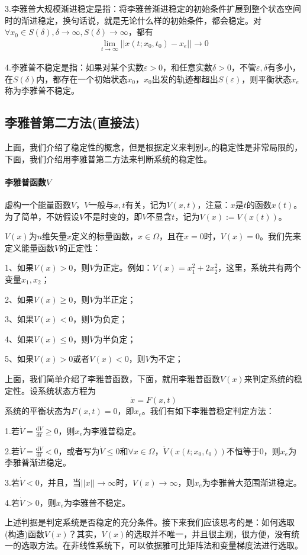         \par
        3.李雅普大规模渐进稳定是指：将李雅普渐进稳定的初始条件扩展到整个状态空间时的渐进稳定，换句话说，就是无论什么样的初始条件，都会稳定。对$\forall x_0\in S(\delta),\delta\rightarrow\infty ,S(\delta)\rightarrow\infty$，都有
        \begin{align*}
        \lim_{t\rightarrow\infty}||x(t;x_0,t_0)-x_e||\rightarrow 0
        \end{align*}
        \par
        4.李雅普不稳定是指：如果对某个实数$\varepsilon>0$，和任意实数$\delta >0$，不管$\varepsilon, \delta$有多小，在$S(\delta)$内，都存在一个初始状态$x_0$，$x_0$出发的轨迹都超出$S(\varepsilon)$，则平衡状态$x_e$称为李雅普不稳定。
    \subsection{李雅普第二方法(直接法)}
        上面，我们介绍了稳定性的概念，但是根据定义来判别$x_e$的稳定性是非常局限的，下面，我们介绍用李雅普第二方法来判断系统的稳定性。
        \paragraph{李雅普函数$V$}虚构一个能量函数$V$，$V$一般与$x,t$有关，记为$V(x,t)$，注意：$x$是$t$的函数$x(t)$。为了简单，不妨假设$V$不是时变的，即$V$不显含$t$，记为$V(x):=V(x(t))$。
        \par
        $V(x)$为$n$维矢量$x$定义的标量函数，$x\in \varOmega$，且在$x=0$时，$V(x)=0$。我们先来定义能量函数$V$的正定性：
        \par
        1、如果$V(x)>0$，则$V$为正定。例如：$V(x)=x_1^2+2x_2^2$，这里，系统共有两个变量$x_1,x_2$；
        \par
        2、如果$V(x)\geq0$，则$V$为半正定；
        \par
        3、如果$V(x)<0$，则$V$为负定；
        \par
        4、如果$V(x)\leq 0$，则$V$为半负定；
        \par
        5、如果$V(x)> 0$或者$V(x)< 0$，则$V$为不定；
        \par
        上面，我们简单介绍了李雅普函数，下面，就用李雅普函数$V(x)$来判定系统的稳定性。设系统状态方程为
        \[
            \dot{x}=F(x,t)
        \]
        系统的平衡状态为$F(x,t)=0$，即$x_e$。我们有如下李雅普稳定判定方法：
        \par
        1.若$\dot{V}=\frac{\mathrm{d}V}{\mathrm{d}t}\geq0$，则$x_e$为李雅普稳定。
        \par
        2.若$\dot{V}=\frac{\mathrm{d}V}{\mathrm{d}t}<0$，或者写为$\dot{V}\leq0$和$\forall x\in \varOmega$，$\dot{V}(x(t;x_0,t_0))$不恒等于0，则$x_e$为李雅普渐进稳定。
        \par
        3.若$\dot{V}<0$，并且，当$||x||\rightarrow\infty$时，$V(x)\rightarrow\infty$，则$x_e$为李雅普大范围渐进稳定。
        \par
        4.若$\dot{V}>0$，则$x_e$为李雅普不稳定。
        \par
        上述判据是判定系统是否稳定的充分条件。接下来我们应该思考的是：如何选取(构造)函数$V(x)$？其实，$V(x)$的选取并不唯一，并且很主观，很方便，没有统一的选取方法。在非线性系统下，可以依据雅可比矩阵法和变量梯度法进行选取。

